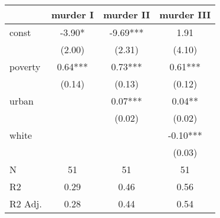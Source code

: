 \usepackage{booktabs}



\begin{table}
\begin{center}
\begin{tabular}{lccc}
\hline
        & murder I & murder II & murder III  \\
\midrule
\midrule
const   & -3.90*   & -9.69***  & 1.91        \\
        & (2.00)   & (2.31)    & (4.10)      \\
poverty & 0.64***  & 0.73***   & 0.61***     \\
        & (0.14)   & (0.13)    & (0.12)      \\
urban   &          & 0.07***   & 0.04**      \\
        &          & (0.02)    & (0.02)      \\
white   &          &           & -0.10***    \\
        &          &           & (0.03)      \\
N       & 51       & 51        & 51          \\
R2      & 0.29     & 0.46      & 0.56        \\
R2 Adj. & 0.28     & 0.44      & 0.54        \\
\hline
\end{tabular}
\end{center}
\end{table}
